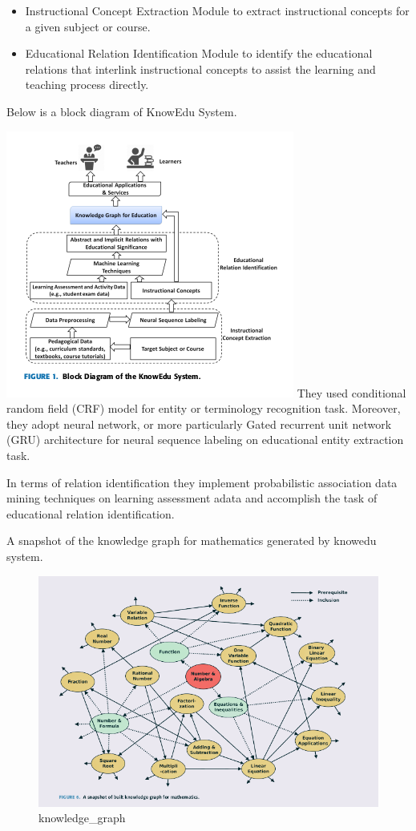 \documentclass[]{book}
\theoremstyle{definition}
\theoremstyle{definition}
\theoremstyle{definition}
\theoremstyle{remark}
\begin{document}
\begin{itemize}
\item
  Instructional Concept Extraction Module to extract instructional
  concepts for a given subject or course.
\item
  Educational Relation Identification Module to identify the educational
  relations that interlink instructional concepts to assist the learning
  and teaching process directly.
\end{itemize}

Below is a block diagram of KnowEdu System.

\includegraphics{img/knowedu.png} They used conditional random field
(CRF) model for entity or terminology recognition task. Moreover, they
adopt neural network, or more particularly Gated recurrent unit network
(GRU) architecture for neural sequence labeling on educational entity
extraction task.

In terms of relation identification they implement probabilistic
association data mining techniques on learning assessment adata and
accomplish the task of educational relation identification.

A snapshot of the knowledge graph for mathematics generated by knowedu
system.

\begin{figure}
\centering
\includegraphics{img/kg.png}
\caption{knowledge\_graph}
\end{figure}
\end{document}
